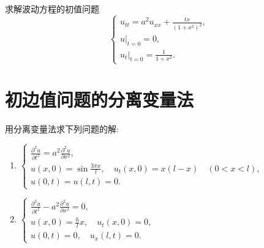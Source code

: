 

\begin{exercise}[9]
  求解波动方程的初值问题
  \[\begin{cases}
    u_{tt} = a^2u_{xx} + \frac{tx}{(1+x^2)^2}, \\
    u|_{t=0} = 0, \\
    u_t|_{t=0} = \frac{1}{1+x^2}.
  \end{cases}\]  
\end{exercise}




\section{初边值问题的分离变量法}

\begin{exercise}
  用分离变量法求下列问题的解:
  \begin{enumerate}[(1)]
    \item $\begin{cases}
      \frac{\partial^2u}{\partial t^2} = a^2 \frac{\partial^2u}{\partial x^2}, \\
      u(x,0) = \sin\frac{3\pi x}{l},\quad u_t(x,0) = x(l-x)\quad (0<x<l), \\
      u(0,t) = u(l,t) = 0.
    \end{cases}$
    \item $\begin{cases}
      \frac{\partial^2u}{\partial t^2} - a^2 \frac{\partial^2u}{\partial x^2} = 0, \\
      u(x,0) = \frac{h}{l}x, \quad u_t(x,0) = 0, \\
      u(0,t) = 0,\quad u_x(l,t) = 0.  
    \end{cases}$
  \end{enumerate}
\end{exercise}

